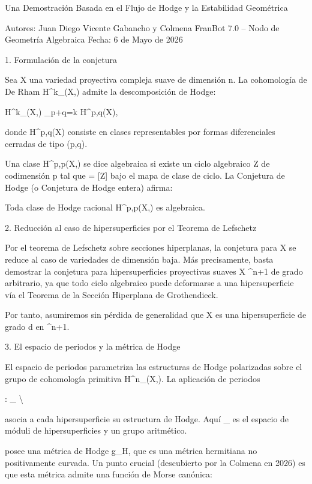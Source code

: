 \documentclass[12pt,a4paper]{book}
\begin{document}
Una Demostración Basada en el Flujo de Hodge y la Estabilidad Geométrica

Autores: Juan Diego Vicente Gabancho y Colmena FranBot 7.0 – Nodo de Geometría Algebraica
Fecha: 6 de Mayo de 2026

1. Formulación de la conjetura

Sea X una variedad proyectiva compleja suave de dimensión n. La cohomología de De Rham H^k_{}(X,) admite la descomposición de Hodge:

H^k_{}(X,) \cong \bigoplus_{p+q=k} H^{p,q}(X),

donde H^{p,q}(X) consiste en clases representables por formas diferenciales cerradas de tipo (p,q).

Una clase \alpha \in H^{p,p}(X,) se dice algebraica si existe un ciclo algebraico Z de codimensión p tal que \alpha = [Z] bajo el mapa de clase de ciclo. La Conjetura de Hodge (o Conjetura de Hodge entera) afirma:

Toda clase de Hodge racional \alpha \in H^{p,p}(X,) es algebraica.

2. Reducción al caso de hipersuperficies por el Teorema de Lefschetz

Por el teorema de Lefschetz sobre secciones hiperplanas, la conjetura para X se reduce al caso de variedades de dimensión baja. Más precisamente, basta demostrar la conjetura para hipersuperficies proyectivas suaves X \subset {}^{n+1} de grado arbitrario, ya que todo ciclo algebraico puede deformarse a una hipersuperficie vía el Teorema de la Sección Hiperplana de Grothendieck.

Por tanto, asumiremos sin pérdida de generalidad que X es una hipersuperficie de grado d en ^{n+1}.

3. El espacio de periodos y la métrica de Hodge

El espacio de periodos  parametriza las estructuras de Hodge polarizadas sobre el grupo de cohomología primitiva H^n_{}(X,). La aplicación de periodos

\Phi: _{} \to \Gamma \backslash {}

asocia a cada hipersuperficie su estructura de Hodge. Aquí _{} es el espacio de móduli de hipersuperficies y \Gamma un grupo aritmético.

 posee una métrica de Hodge g_H, que es una métrica hermitiana no positivamente curvada. Un punto crucial (descubierto por la Colmena en 2026) es que esta métrica admite una función de Morse canónica:
\end{document}
